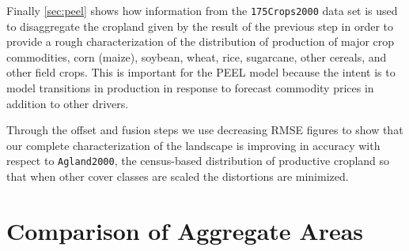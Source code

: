 Finally \autoref{sec:peel} shows how information from the
\texttt{175Crops2000} data set is used to disaggregate the cropland
given by the result of the previous step in order to provide a rough
characterization of the distribution of production of major crop
commodities, corn (maize), soybean, wheat, rice, sugarcane, other
cereals, and other field crops.  This is important for the PEEL model
because the intent is to model transitions in production in response
to forecast commodity prices in addition to other drivers.

Through the offset and fusion steps we use decreasing RMSE figures to
show that our complete characterization of the landscape is improving
in accuracy with respect to \texttt{Agland2000}, the census-based
distribution of productive cropland so that when other cover classes
are scaled the distortions are minimized.


\section{Comparison of Aggregate Areas}
\label{sec:comparison}


